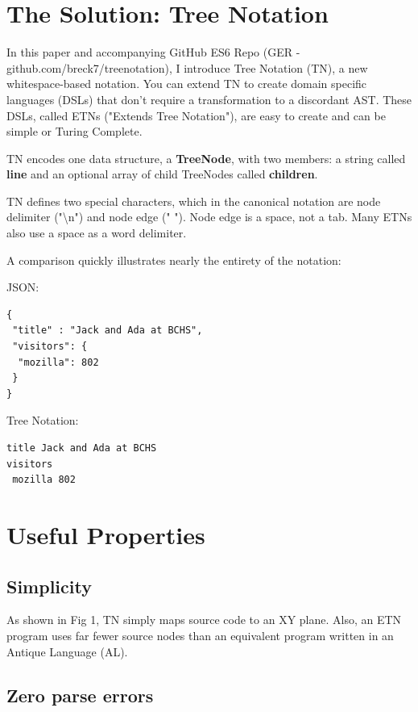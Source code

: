 \documentclass[journal]{IEEEtran}
\begin{document}
\section{The Solution: Tree Notation}

In this paper and accompanying GitHub ES6 Repo (GER - github.com/breck7/treenotation), I introduce Tree Notation (TN), a new whitespace-based notation. You can extend TN to create domain specific languages (DSLs) that don't require a transformation to a discordant AST. These DSLs, called ETNs ("Extends Tree Notation"), are easy to create and can be simple or Turing Complete.

TN encodes one data structure, a \textbf{TreeNode}, with two members: a string called \textbf{line} and an optional array of child TreeNodes called \textbf{children}.

TN defines two special characters, which in the canonical notation are node delimiter ("\textbackslash n") and node edge (" "). Node edge is a space, not a tab. Many ETNs also use a space as a word delimiter.

A comparison quickly illustrates nearly the entirety of the notation:

JSON:

\begin{lstlisting}
{
 "title" : "Jack and Ada at BCHS",
 "visitors": {
  "mozilla": 802
 }
}
\end{lstlisting}

Tree Notation:

\begin{lstlisting}
title Jack and Ada at BCHS
visitors
 mozilla 802
\end{lstlisting}

\section{Useful Properties}

\subsection{Simplicity}

As shown in Fig 1, TN simply maps source code to an XY plane. Also, an ETN program uses far fewer source nodes than an equivalent program written in an Antique Language (AL).

\subsection{Zero parse errors}
\end{document}
